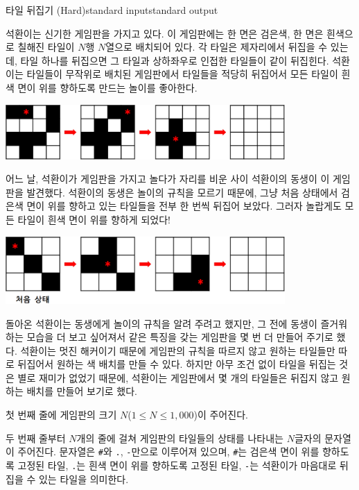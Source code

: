 \begin{problem}{타일 뒤집기 (Hard)}{standard input}{standard output}

석환이는 신기한 게임판을 가지고 있다. 이 게임판에는 한 면은 검은색, 한 면은 흰색으로 칠해진 타일이 $N$행 $N$열으로 배치되어 있다. 각 타일은 제자리에서 뒤집을 수 있는데, 타일 하나를 뒤집으면 그 타일과 상하좌우로 인접한 타일들이 같이 뒤집힌다. 석환이는 타일들이 무작위로 배치된 게임판에서 타일들을 적당히 뒤집어서 모든 타일이 흰색 면이 위를 향하도록 만드는 놀이를 좋아한다.

\begin{center}
  \includegraphics[width=0.8\textwidth]{tile1.png}
\end{center}

어느 날, 석환이가 게임판을 가지고 놀다가 자리를 비운 사이 석환이의 동생이 이 게임판을 발견했다. 석환이의 동생은 놀이의 규칙을 모르기 때문에, 그냥 처음 상태에서 검은색 면이 위를 향하고 있는 타일들을 전부 한 번씩 뒤집어 보았다. 그러자 놀랍게도 모든 타일이 흰색 면이 위를 향하게 되었다!

\begin{center}
  \includegraphics[width=0.8\textwidth]{tile2.png}
\end{center}

돌아온 석환이는 동생에게 놀이의 규칙을 알려 주려고 했지만, 그 전에 동생이 즐거워하는 모습을 더 보고 싶어져서 같은 특징을 갖는 게임판을 몇 번 더 만들어 주기로 했다. 석환이는 멋진 해커이기 때문에 게임판의 규칙을 따르지 않고 원하는 타일들만 따로 뒤집어서 원하는 색 배치를 만들 수 있다. 하지만 아무 조건 없이 타일을 뒤집는 것은 별로 재미가 없었기 때문에, 석환이는 게임판에서 몇 개의 타일들은 뒤집지 않고 원하는 배치를 만들어 보기로 했다.

\InputFile
첫 번째 줄에 게임판의 크기 $N$($1 \le N \le 1,000$)이 주어진다.

두 번째 줄부터 $N$개의 줄에 걸쳐 게임판의 타일들의 상태를 나타내는 $N$글자의 문자열이 주어진다. 문자열은 \texttt{\#}와 \texttt{.}, \texttt{-}만으로 이루어져 있으며, \texttt{\#}는 검은색 면이 위를 향하도록 고정된 타일, \texttt{.}는 흰색 면이 위를 향하도록 고정된  타일, \texttt{-}는 석환이가 마음대로 뒤집을 수 있는 타일을 의미한다.


\end{problem}
